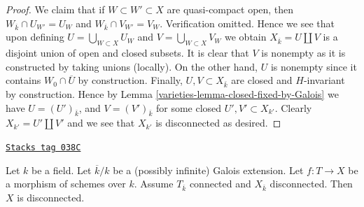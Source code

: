 \begin{proof}
\medskip\noindent
We claim that if $W \subset W' \subset X$ are quasi-compact
open, then $W_{\overline{k}} \cap U_{W'} = U_W$ and
$W_{\overline{k}} \cap V_{W'} = V_W$. Verification omitted.
Hence we see that upon defining $U = \bigcup_{W \subset X} U_W$
and $V = \bigcup_{W \subset X} V_W$ we obtain
$X_{\overline{k}} = U \amalg V$ is a disjoint union of open
and closed subsets.
It is clear that $V$ is nonempty as it is constructed by taking
unions (locally). On the other hand, $U$ is nonempty since it contains
$W_0 \cap \overline{U}$ by construction. Finally, $U, V \subset X_{\bar k}$
are closed and $H$-invariant by construction. Hence by
Lemma \ref{varieties-lemma-closed-fixed-by-Galois}
we have $U = (U')_{\bar k}$, and $V = (V')_{\bar k}$ for some
closed $U', V' \subset X_{k'}$. Clearly $X_{k'} = U' \amalg V'$
and we see that $X_{k'}$ is disconnected as desired.
\end{proof}

\begin{lemma}[Tricky]
\label{varieties-lemma-tricky}
\href{https://stacks.math.columbia.edu/tag/038C}{\texttt{Stacks tag 038C}}

Let $k$ be a field. Let $\overline{k}/k$ be a (possibly infinite)
Galois extension. Let $f : T \to X$ be a morphism of schemes over $k$.
Assume $T_{\overline{k}}$ connected and $X_{\overline{k}}$
disconnected. Then $X$ is disconnected.
\end{lemma}

